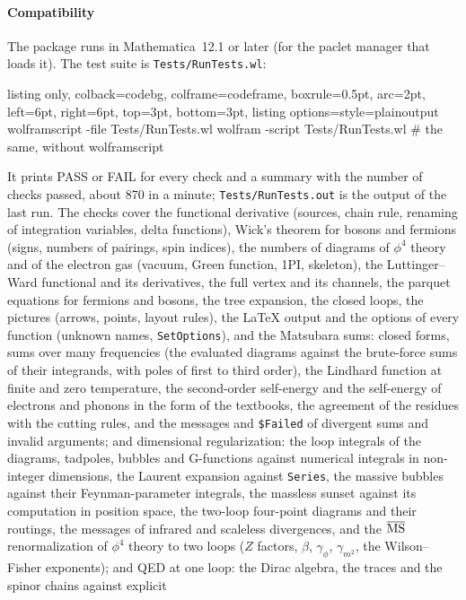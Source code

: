 \documentclass[11pt,a4paper]{article}
\newcommand{\pkg}[1]{\texttt{#1}}
\begin{document}
\paragraph{Compatibility} The package runs in Mathematica~12.1 or later (for the paclet manager that loads it). The
test suite is \pkg{Tests/RunTests.wl}:
\begin{tcblisting}{listing only, colback=codebg, colframe=codeframe, boxrule=0.5pt, arc=2pt, left=6pt, right=6pt,
  top=3pt, bottom=3pt, listing options={style=plainoutput}}
wolframscript -file Tests/RunTests.wl
wolfram -script Tests/RunTests.wl         # the same, without wolframscript
\end{tcblisting}
It prints PASS or FAIL for every check and a summary with the number of checks passed, about 870 in a minute;
\pkg{Tests/RunTests.out} is the output of the last run. The checks cover the functional derivative (sources, chain rule,
renaming of integration variables, delta functions), Wick's theorem for bosons and fermions (signs, numbers of pairings,
spin indices), the numbers of diagrams of $\phi^4$ theory and of the electron gas (vacuum, Green function, 1PI,
skeleton), the Luttinger--Ward functional and its derivatives, the full vertex and its channels, the parquet equations
for fermions and bosons, the tree expansion, the closed loops, the pictures (arrows, points, layout rules), the
\LaTeX{} output and the options of every function (unknown names, \pkg{SetOptions}), and the Matsubara sums: closed forms, sums over many frequencies (the evaluated diagrams against the
brute-force sums of their integrands, with poles of first to third order), the Lindhard function at finite and zero
temperature, the second-order self-energy and the self-energy of electrons and phonons in the form of the textbooks, the
agreement of the residues with the cutting rules, and the messages and \pkg{\$Failed} of divergent sums and invalid
arguments; and dimensional regularization: the loop integrals of the diagrams, tadpoles, bubbles and G-functions against
numerical integrals in non-integer dimensions, the Laurent expansion against \pkg{Series}, the massive
bubbles against their Feynman-parameter integrals, the massless sunset against its computation in position space, the
two-loop four-point diagrams and their routings, the messages of infrared and scaleless divergences, and the
$\overline{\rm MS}$ renormalization of $\phi^4$ theory to two loops ($Z$ factors, $\beta$, $\gamma_\phi$, $\gamma_{m^2}$, the
Wilson--Fisher exponents); and QED at one loop: the Dirac algebra, the traces and the spinor chains against explicit
\end{document}
